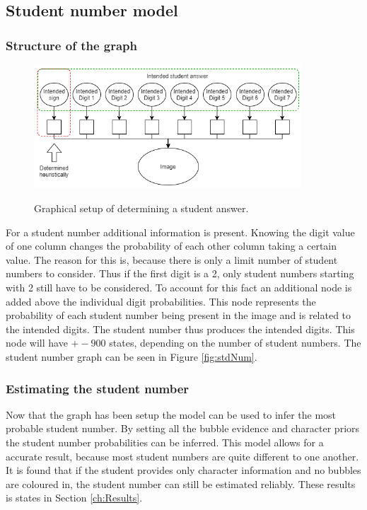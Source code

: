 \subsection{Student number model}
\label{sec:pgmStudentNum}

\subsubsection{Structure of the graph}

\begin{figure}
  \centering
  \includegraphics[width=10cm]{ans}\\
  \caption{Graphical setup of determining a student answer.}
  \label{fig:ans}
\end{figure}

For a student number additional information is present. Knowing the digit value of one column changes the probability of each other column taking a certain value. The reason for this is, because there is only a limit number of student numbers to consider. Thus if the first digit is a 2, only student numbers starting with 2 still have to be considered. To account for this fact an additional node is added above the individual digit probabilities. This node represents the probability of each student number being present in the image and is related to the intended digits. The student number thus produces the intended digits. This node will have $+- 900$ states, depending on the number of student numbers. The student number graph can be seen in Figure \ref{fig:stdNum}.

\subsubsection{Estimating the student number}

Now that the graph has been setup the model can be used to infer the most probable student number. By setting all the bubble evidence and character priors the student number probabilities can be inferred. This model allows for a accurate result, because most student numbers are quite different to one another. It is found that if the student provides only character information and no bubbles are coloured in, the student number can still be estimated reliably. These results is states in Section \ref{ch:Results}.

